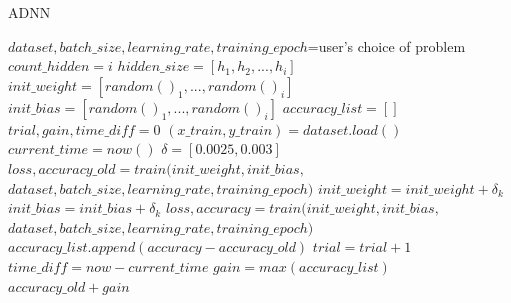 \begin{algorithm}
	\footnotesize
	\caption{\footnotesize ADNN}
	\label{algo:util}
	\begin{algorithmic}[1]
		\State $dataset,batch\_size, learning\_rate, training\_epoch$=user's choice of problem
		\State $count\_hidden=i$
		\State $hidden\_size=[h_1,h_2,...,h_i]$
		\State $init\_weight=[random()_1,...,random()_i]$
		\State $init\_bias=[random()_1,...,random()_i]$
		\State $accuracy\_list=[]$
		\State $trial,gain,time\_diff=0$
		\State	$(x\_train, y\_train)=dataset.load()$
		\State $current\_time=now()$
		\State $\delta=[0.0025, 0.003]$
		\State $loss, accuracy\_old=train(init\_weight,init\_bias,$
					$dataset,batch\_size, learning\_rate, training\_epoch)$
		\State $init\_weight=init\_weight+\delta_k$
		\State $init\_bias=init\_bias+\delta_k$
		\State $loss, accuracy=train(init\_weight,init\_bias,$
		$dataset,batch\_size, learning\_rate, training\_epoch)$
		\State $accuracy\_list.append(accuracy-accuracy\_old)$
		\State $trial=trial+1$
		\State $time\_diff=now-current\_time$
		\State $gain=max(accuracy\_list)$
		\EndWhile
		\EndFor
		\State \Return $accuracy\_old+gain$
		\EndProcedure
	\end{algorithmic} 
\end{algorithm}


